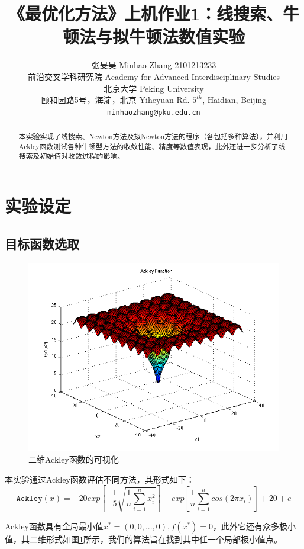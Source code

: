 \documentclass{article}
\title{《最优化方法》上机作业1：线搜索、牛顿法与拟牛顿法数值实验}
\author{%
  张旻昊 Minhao Zhang 2101213233 \\
  前沿交叉学科研究院 Academy for Advanced Interdisciplinary Studies\\
  北京大学 Peking University\\
  颐和园路5号，海淀，北京 Yiheyuan Rd. $5^{th}$, Haidian, Beijing\\
  \texttt{minhaozhang@pku.edu.cn} \\
}
\begin{document}

\maketitle

\begin{abstract}
  本实验实现了线搜索、Newton方法及拟Newton方法的程序（各包括多种算法），并利用Ackley函数测试各种牛顿型方法的收敛性能、精度等数值表现，此外还进一步分析了线搜索及初始值对收敛过程的影响。
  
\end{abstract}

\section{实验设定}
\subsection{目标函数选取}
\begin{figure}[h]
  \centering
  \includegraphics[width=.65\linewidth]{pics/ackley.png}
  \caption{二维Ackley函数的可视化}
  \label{fig:ackley}
\end{figure}

本实验通过Ackley函数评估不同方法，其形式如下：
\[ \texttt{Ackley}(x) = -20 exp[-\frac{1}{5} \sqrt{\frac{1}{n}\sum\limits_{i=1}^n x_i^2}] - exp[\frac{1}{n} \sum\limits_{i=1}^n cos(2\pi x_i)] + 20+e \]

Ackley函数具有全局最小值$x^* = (0,0,...,0), f(x^*)=0$，此外它还有众多极小值，其二维形式如图\ref{fig:ackley}所示，我们的算法旨在找到其中任一个局部极小值点。
\end{document}

